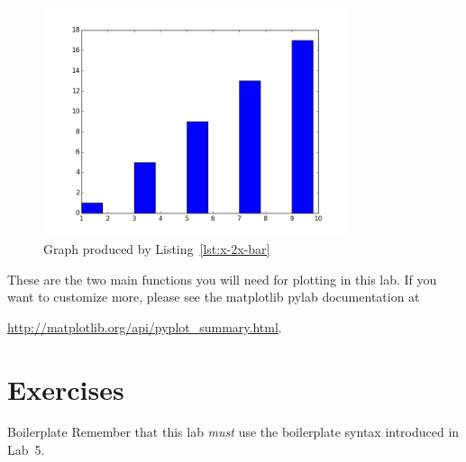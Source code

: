 \documentclass[11pt]{cselabheader}
\begin{document}
\begin{figure}[!ht]
  \centering
  \includegraphics[width=0.8\textwidth]{lab11/x-2x-bar-plot.png}
  \caption{Graph produced by Listing~\ref{lst:x-2x-bar}}
  \label{fig:x-2x-bar}
\end{figure}

These are the two main functions you will need for plotting in this lab. If you
want to customize more, please see the matplotlib pylab documentation at
\begin{center}
  \url{http://matplotlib.org/api/pyplot_summary.html}.
\end{center}

\pagebreak

\section{Exercises}
\label{sec:ex}


\begin{warningbox}{Boilerplate}
  Remember that this lab \emph{must} use the
  boilerplate syntax introduced in Lab~5.
\end{warningbox}
\end{document}
